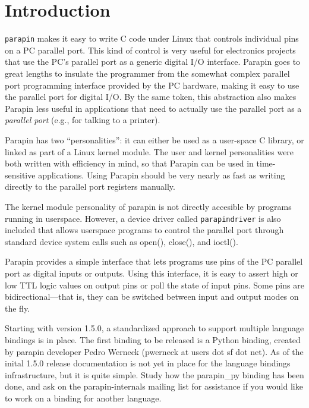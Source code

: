 \documentclass{article}
\begin{document}
\begin{latexonly}

\tableofcontents
\clearpage
\end{latexonly}


\section{Introduction}


{\tt parapin} makes it easy to write C code under Linux that controls
individual pins on a PC parallel port.  This kind of control is very
useful for electronics projects that use the PC's parallel port as a
generic digital I/O interface.  Parapin goes to great lengths to
insulate the programmer from the somewhat complex parallel port
programming interface provided by the PC hardware, making it easy to
use the parallel port for digital I/O.  By the same token, this
abstraction also makes Parapin less useful in applications that need
to actually use the parallel port as a {\em parallel port} (e.g., for
talking to a printer).

Parapin has two ``personalities'': it can either be used as a
user-space C library, or linked as part of a Linux kernel module.  The
user and kernel personalities were both written with efficiency in
mind, so that Parapin can be used in time-sensitive applications.
Using Parapin should be very nearly as fast as writing directly to the
parallel port registers manually.

The kernel module personality 
of parapin is not directly accesible by programs running in userspace.
However, 
a device driver called {\tt parapindriver} is also included that allows
userspace programs to control the parallel port through standard device
system calls such as open(), close(), and ioctl().

Parapin provides a simple interface that lets programs use pins of the
PC parallel port as digital inputs or outputs.  Using this interface,
it is easy to assert high or low TTL logic values on output pins or
poll the state of input pins.  Some pins are bidirectional---that is,
they can be switched between input and output modes on the fly.

Starting with version 1.5.0, a standardized approach to support
multiple language bindings is in place.  The first binding to
be released is a Python binding, created by parapin developer
Pedro Werneck (pwerneck at users dot sf dot net).  As of the
inital 1.5.0 release documentation is not yet in place for the
language bindings infrastructure, but it is quite simple.  Study
how the parapin\_py binding has been done, and ask on the
parapin-internals mailing list for assistance if you would like to
work on a binding for another language.
\end{document}

